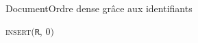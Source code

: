 \begin{frame}{Document}{Ordre dense grâce aux identifiants}

  \begin{center}
  \textsc{insert}$($\texttt{R}, $0)$   \\
  \end{center}

  \vspace{1cm}

  \begin{center}
    
  \end{center}

\end{frame}



  
  

